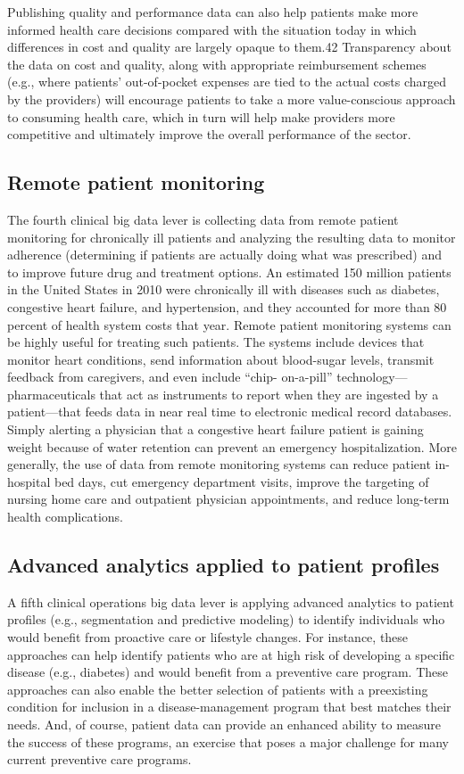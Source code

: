 \documentclass[twocolumn]{article}
\begin{document}
Publishing quality and performance data can also help patients make more informed health care decisions compared with the situation today in which differences in cost and quality are largely opaque to them.42 Transparency about the data on cost and quality, along with appropriate reimbursement schemes (e.g., where patients’ out-of-pocket expenses are tied to the actual costs charged by the providers) will encourage patients to take a more value-conscious approach to consuming health care, which in turn will help make providers more competitive and ultimately improve the overall performance of the sector.

\subsection{Remote patient monitoring} 
The fourth clinical big data lever is collecting data from remote patient monitoring for chronically ill patients and analyzing the resulting data to monitor adherence (determining if patients are actually doing what was prescribed) and to improve future drug and treatment options. An estimated 150 million patients in the United States in 2010 were chronically ill with diseases such as diabetes, congestive heart failure, and hypertension, and they accounted for more than 80 percent of health system costs that year. Remote patient monitoring systems can be highly useful for treating such patients. The systems include devices that monitor heart conditions, send information about blood-sugar levels, transmit feedback from caregivers, and even include “chip- on-a-pill” technology—pharmaceuticals that act as instruments to report when they are ingested by a patient—that feeds data in near real time to electronic
medical record databases. Simply alerting a physician that a congestive heart failure patient is gaining weight because of water retention can prevent an emergency hospitalization. More generally, the use of data from remote monitoring systems can reduce patient in-hospital bed days, cut emergency department visits, improve the targeting of nursing home care and outpatient physician appointments, and reduce long-term health complications.

\subsection{Advanced analytics applied to patient profiles}
A fifth clinical operations big data lever is applying advanced analytics to patient profiles (e.g., segmentation and predictive modeling) to identify individuals who would benefit from proactive care or lifestyle changes. For instance, these approaches can help identify patients who are at high risk of developing a specific disease (e.g., diabetes) and would benefit from
a preventive care program. These approaches can also enable the better selection of patients with a preexisting condition for inclusion in a disease-management program that best matches their needs. And, of course, patient data can provide an enhanced ability to measure the success of these programs, an exercise that poses a major challenge for many current preventive care programs.
\end{document}
